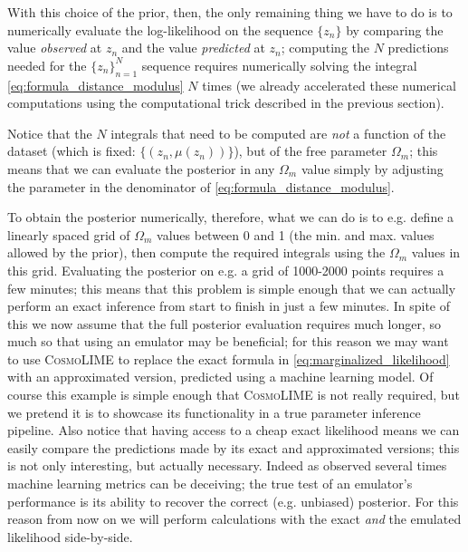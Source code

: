 With this choice of the prior, then, the only remaining thing we have to do is to numerically evaluate the log-likelihood on the sequence $\{z_n\}$ by comparing the value \emph{observed} at $z_n$ and the value \emph{predicted} at $z_n$; computing the $N$ predictions needed for the $\{z_n\}_{n=1}^N$ sequence requires numerically solving the integral \eqref{eq:formula_distance_modulus} $N$ times (we already accelerated these numerical computations using the computational trick described in the previous section).

Notice that the $N$ integrals that need to be computed are \emph{not} a function of the dataset (which is fixed: $\{(z_n, \mu(z_n))\}$), but of the free parameter $\Omega_m$; this means that we can evaluate the posterior in any $\Omega_m$ value simply by adjusting the parameter in the denominator of \eqref{eq:formula_distance_modulus}.

To obtain the posterior numerically, therefore, what we can do is to e.g. define a linearly spaced grid of $\Omega_m$ values between 0 and 1 (the min. and max. values allowed by the prior), then compute the required integrals using the $\Omega_m$ values in this grid.
Evaluating the posterior on e.g. a grid of 1000-2000 points requires a few minutes; this means that this problem is simple enough that we can actually perform an exact inference from start to finish in just a few minutes.
In spite of this we now assume that the full posterior evaluation requires much longer, so much so that using an emulator may be beneficial; for this reason we may want to use \textsc{CosmoLIME} to replace the exact formula in \eqref{eq:marginalized_likelihood} with an approximated version, predicted using a machine learning model. Of course this example is simple enough that \textsc{CosmoLIME} is not really required, but we pretend it is to showcase its functionality in a true parameter inference pipeline.
Also notice that having access to a cheap exact likelihood means we can easily compare the predictions made by its exact and approximated versions; this is not only interesting, but actually necessary. Indeed as observed several times machine learning metrics can be deceiving; the true test of an emulator's performance is its ability to recover the correct (e.g. unbiased) posterior.
For this reason from now on we will perform calculations with the exact \emph{and} the emulated likelihood side-by-side.

